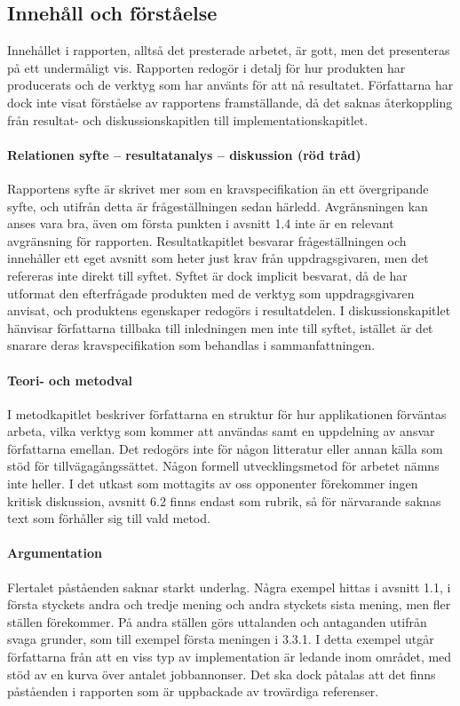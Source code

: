     \subsection{Innehåll och förståelse} %
    \label{sub:innehall}
    Innehållet i rapporten, alltså det presterade arbetet, är gott, men det presenteras på ett undermåligt vis. Rapporten redogör i detalj för hur produkten har producerats och de verktyg som har använts för att nå resultatet. Författarna har dock inte visat förståelse av rapportens framställande, då det saknas återkoppling från resultat- och diskussionskapitlen till implementationskapitlet.

    \paragraph{Relationen syfte – resultatanalys – diskussion (röd tråd)}
        Rapportens syfte är skrivet mer som en kravspecifikation än ett övergripande syfte, och utifrån detta är frågeställningen sedan härledd. Avgränsningen kan anses vara bra, även om första punkten i avsnitt 1.4 inte är en relevant avgränsning för rapporten. Resultatkapitlet besvarar frågeställningen och innehåller ett eget avsnitt som heter just krav från uppdragsgivaren, men det refereras inte direkt till syftet. Syftet är dock implicit besvarat, då de har utformat den efterfrågade produkten med de verktyg som uppdragsgivaren anvisat, och produktens egenskaper redogörs i resultatdelen. I diskussionskapitlet hänvisar författarna tillbaka till inledningen men inte till syftet, istället är det snarare deras kravspecifikation som behandlas i sammanfattningen.

    \paragraph{Teori- och metodval}
        I metodkapitlet beskriver författarna en struktur för hur applikationen förväntas arbeta, vilka verktyg som kommer att användas samt en uppdelning av ansvar författarna emellan. Det redogörs inte för någon litteratur eller annan källa som stöd för tillvägagångssättet. Någon formell utvecklingsmetod för arbetet nämns inte heller. I det utkast som mottagits av oss opponenter förekommer ingen kritisk diskussion, avsnitt 6.2 finns endast som rubrik, så för närvarande saknas text som förhåller sig till vald metod.

    \paragraph{Argumentation}
        Flertalet påståenden saknar starkt underlag. Några exempel hittas i avsnitt 1.1, i första styckets andra och tredje mening och andra styckets sista mening, men fler ställen förekommer. På andra ställen görs uttalanden och antaganden utifrån svaga grunder, som till exempel första meningen i 3.3.1. I detta exempel utgår författarna från att en viss typ av implementation är ledande inom området, med stöd av en kurva över antalet jobbannonser. Det ska dock påtalas att det finns påståenden i rapporten som är uppbackade av trovärdiga referenser.

